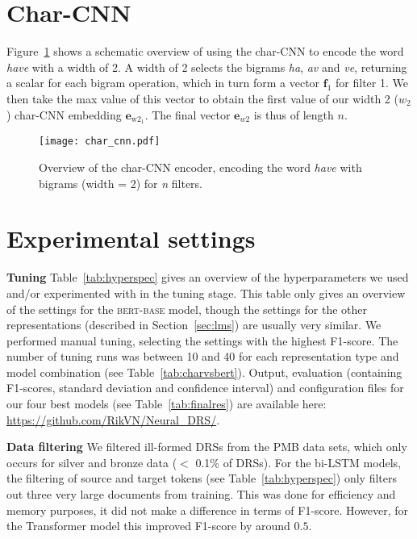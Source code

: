 \documentclass[11pt,a4paper]{article}
\newcommand{\bertbase}{\textsc{bert-base}}
\newcommand{\vect}[1]{\mathbf{#1}}
\newcommand{\inlineheader}[1]{\vspace{0.06cm}
\noindent\textbf{#1}\quad
}
\begin{document}



\appendix

\section{Char-CNN}
\label{app:charcnn}

Figure~\ref{fig:charcnn} shows a schematic overview of using the char-CNN \citep{kim2016character} to encode the word \emph{have} with a width of 2.  A width of 2 selects the bigrams \emph{ha}, \emph{av} and \emph{ve}, returning a scalar for each bigram operation, which in turn form a vector $\vect{f}_1$ for filter 1. We then take the max value of this vector to obtain the first value of our width 2 ($w_2$) char-CNN embedding $\vect{e}_{\mathrm{w2}_1}$. The final vector $\vect{e}_{w2}$ is thus of length $n$.

\begin{figure}[!htb]
\texttt{[image: char\_cnn.pdf]}
  \caption{Overview of the char-CNN encoder, encoding the word \emph{have} with bigrams (width = 2) for \emph{n} filters.\label{fig:charcnn}}
\end{figure}

\section{Experimental settings}
\label{sec:hyperappendix}

\inlineheader{Tuning} Table~\ref{tab:hyperspec} gives an overview of the hyperparameters we used and/or experimented with in the tuning stage. This table only gives an overview of the settings for the \bertbase{} model, though the settings for the other representations (described in Section~\ref{sec:lms}) are usually very similar. We performed manual tuning, selecting the settings with the highest F1-score. The number of tuning runs was between 10 and 40 for each representation type and model combination (see Table~\ref{tab:charvsbert}). Output, evaluation (containing F1-scores, standard deviation and confidence interval) and configuration files for our four best models (see Table~\ref{tab:finalres}) are available here: \url{https://github.com/RikVN/Neural_DRS/}.

\inlineheader{Data filtering}We filtered ill-formed DRSs from the PMB data sets, which only occurs for silver and bronze data ($<$ 0.1\% of DRSs). For the bi-LSTM models, the filtering of source and target tokens (see  Table~\ref{tab:hyperspec}) only filters out three very large documents from training. This was done for efficiency and memory purposes, it did not make a difference in terms of F1-score. However, for the Transformer model this improved F1-score by around $0.5$.
\end{document}
